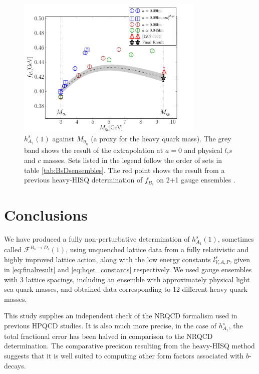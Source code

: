 \begin{figure}[htb!]
  \begin{center}
  \hspace{-20pt}
  \includegraphics[width=0.80\textwidth]{images/BsDsstar/fHcvsmh.pdf}
  \caption{ $h_{A_1}^s(1)$ against $M_{\eta_h}$ (a proxy for the heavy quark mass). The grey band shows the result of the extrapolation at $a=0$ and physical $l$,$s$ and $c$ masses. Sets listed in the legend follow the order of sets in table \ref{tab:BsDsensembles}. The red point shows the result from a previous heavy-HISQ determination of $f_{B_c}$ on 2+1 gauge ensembles \cite{McNeile:2012qf}. \label{fig:fHc_vsmh}}
  \end{center}
\end{figure}

\section{Conclusions}
\label{sec:conclusions}

We have produced a fully non-perturbative determination of $h_{A_1}^s(1)$, sometimes called $\mathcal{F}^{B_s\to D_s}(1)$, using unquenched lattice data from a fully relativistic and highly improved lattice action, along with the low energy constants $l_{V,A,P}^s$, given in \eqref{eq:finalresult} and \eqref{eq:hqet_constants} respectively. We used gauge ensembles with 3 lattice spacings, including an ensemble with approximately physical light sea quark masses, and obtained data corresponding to 12 different heavy quark masses.

This study supplies an independent check of the NRQCD formalism used in previous HPQCD studies. It is also much more precise, in the case of $h_{A_1}^s$, the total fractional error has been halved in comparison to the NRQCD determination. The comparative precision resulting from the heavy-HISQ method suggests that it is well suited to computing other form factors associated with $b$-decays. 



